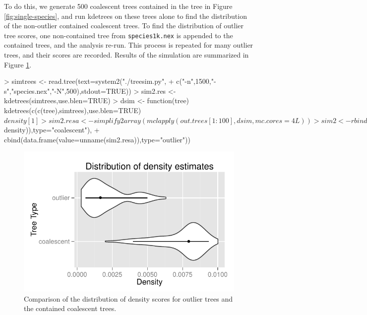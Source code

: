 \documentclass{article}
\begin{document}
To do this, we generate 500 coalescent trees contained in the tree in
Figure \ref{fig:single-species}, and run kdetrees on these trees
alone to find the distribution of the non-outlier contained coalescent
trees. To find the distribution of outlier tree scores, one
non-contained tree from {\tt species1k.nex} is appended to the
contained trees, and the analysis re-run. This process is repeated for
many outlier trees, and their scores are recorded. Results of the
simulation are summarized in Figure \ref{fig:distributions}.
\begin{Schunk}
\begin{Sinput}
> simtrees <- read.tree(text=system2("./treesim.py",
+                         c("-n",1500,"-s","species.nex","-N",500),stdout=TRUE))
> sim2.res <- kdetrees(simtrees,use.blen=TRUE)
> dsim <- function(tree) kdetrees(c(c(tree),simtrees),use.blen=TRUE)$density[1]
> sim2.resa <- simplify2array(mclapply(out.trees[1:100],dsim,mc.cores=4L))
> sim2 <- rbind(cbind(data.frame(value=unname(sim2.res$density)),type="coalescent"),
+               cbind(data.frame(value=unname(sim2.resa)),type="outlier"))
\end{Sinput}
\end{Schunk}

\begin{figure}
  \centering
\includegraphics{simulation-015}
  \caption{Comparison of the distribution of density scores for outlier trees and the contained coalescent trees.}
  \label{fig:distributions}
\end{figure}
\end{document}
